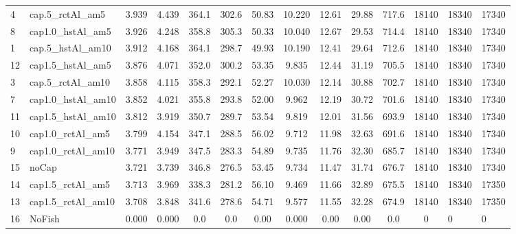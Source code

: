 \documentclass[11pt]{book}
\begin{document}
\begin{landscape}
\begin{longtable}[t]{llccccccccccll}
4 & cap.5\_rctAl\_am5 & 3.939 & 4.439 & 364.1 & 302.6 & 50.83 & 10.220 & 12.61 & 29.88 & 717.6 & 18140 & 18340 & 17340\\
8 & cap1.0\_hstAl\_am5 & 3.926 & 4.248 & 358.8 & 305.3 & 50.33 & 10.040 & 12.67 & 29.53 & 714.4 & 18140 & 18340 & 17340\\
1 & cap.5\_hstAl\_am10 & 3.912 & 4.168 & 364.1 & 298.7 & 49.93 & 10.190 & 12.41 & 29.64 & 712.6 & 18140 & 18340 & 17340\\
12 & cap1.5\_hstAl\_am5 & 3.876 & 4.071 & 352.0 & 300.2 & 53.35 & 9.835 & 12.44 & 31.19 & 705.5 & 18140 & 18340 & 17340\\
3 & cap.5\_rctAl\_am10 & 3.858 & 4.115 & 358.3 & 292.1 & 52.27 & 10.030 & 12.14 & 30.88 & 702.7 & 18140 & 18340 & 17340\\
7 & cap1.0\_hstAl\_am10 & 3.852 & 4.021 & 355.8 & 293.8 & 52.00 & 9.962 & 12.19 & 30.72 & 701.6 & 18140 & 18340 & 17340\\
11 & cap1.5\_hstAl\_am10 & 3.812 & 3.919 & 350.7 & 289.7 & 53.54 & 9.819 & 12.01 & 31.56 & 693.9 & 18140 & 18340 & 17340\\
10 & cap1.0\_rctAl\_am5 & 3.799 & 4.154 & 347.1 & 288.5 & 56.02 & 9.712 & 11.98 & 32.63 & 691.6 & 18140 & 18340 & 17340\\
9 & cap1.0\_rctAl\_am10 & 3.771 & 3.949 & 347.5 & 283.3 & 54.89 & 9.735 & 11.76 & 32.30 & 685.7 & 18140 & 18340 & 17340\\
15 & noCap & 3.721 & 3.739 & 346.8 & 276.5 & 53.45 & 9.734 & 11.47 & 31.74 & 676.7 & 18140 & 18340 & 17340\\
14 & cap1.5\_rctAl\_am5 & 3.713 & 3.969 & 338.3 & 281.2 & 56.10 & 9.469 & 11.66 & 32.89 & 675.5 & 18140 & 18340 & 17350\\
13 & cap1.5\_rctAl\_am10 & 3.708 & 3.848 & 341.6 & 278.6 & 54.71 & 9.577 & 11.55 & 32.28 & 674.9 & 18140 & 18340 & 17350\\
16 & NoFish & 0.000 & 0.000 & 0.0 & 0.0 & 0.00 & 0.000 & 0.00 & 0.00 & 0.0 & 0 & 0 & 0\\*
\end{longtable}
\endgroup{}
\end{landscape}
\endgroup{}

\newpage
\end{document}

